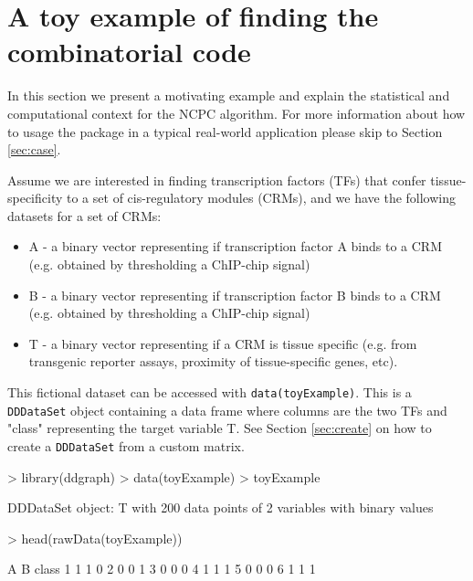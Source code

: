 \documentclass{article}
\newcommand{\Robj}[1]{{\texttt{#1}}}
\begin{document}
\section{A toy example of finding the combinatorial code}

In this section we present a motivating example and explain the statistical and computational context for the NCPC algorithm. For more information about how to usage the package in a typical real-world application please skip to Section \ref{sec:case}.

Assume we are interested in finding transcription factors (TFs) that confer tissue-specificity to a set of cis-regulatory modules (CRMs), and we have the following datasets for a set of CRMs:

\begin{itemize}
\item A - a binary vector representing if transcription factor A binds to a CRM (e.g. obtained by thresholding a ChIP-chip signal)
\item B - a binary vector representing if transcription factor B binds to a CRM (e.g. obtained by thresholding a ChIP-chip signal)
\item T - a binary vector representing if a CRM is tissue specific (e.g. from transgenic reporter assays, proximity of tissue-specific genes, etc). 
\end{itemize}

This fictional dataset can be accessed with \Robj{data(toyExample)}. This is a \Robj{DDDataSet} object containing a data frame where columns are the two TFs and "class" representing the target variable T. See Section \ref{sec:create} on how to create a \Robj{DDDataSet} from a custom matrix. 


\begin{Schunk}
\begin{Sinput}
> library(ddgraph)
> data(toyExample)
> toyExample
\end{Sinput}
\begin{Soutput}
DDDataSet object: T 
with 200 data points of 2 variables with binary values
\end{Soutput}
\begin{Sinput}
> head(rawData(toyExample))
\end{Sinput}
\begin{Soutput}
  A B class
1 1 1     0
2 0 0     1
3 0 0     0
4 1 1     1
5 0 0     0
6 1 1     1
\end{Soutput}
\end{Schunk}
\end{document}
